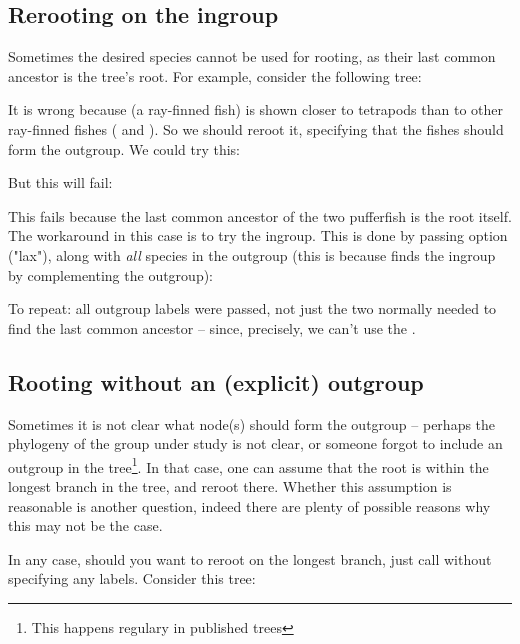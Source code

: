 \subsection{Rerooting on the ingroup}

Sometimes the desired species cannot be used for rooting, as their last common ancestor is the tree's root. For example, consider the following tree:


It is wrong because  (a ray-finned fish) is shown
closer to tetrapods than to other ray-finned fishes ( and
). So we should reroot it, specifying that the fishes should
form the outgroup. We could try this:


But this will fail:


This fails because the last common ancestor of the two pufferfish is
the root itself. The workaround in this case is to try the ingroup. This is
done by passing option  ("lax"), along with {\em all} species in
the outgroup (this is because \reroot{} finds the ingroup by complementing the
outgroup):


To repeat: all outgroup labels were passed, not just the two
normally needed to find the last common ancestor -- since, precisely, we can't
use the \lca.

\subsection[sct:no-outgroup]{Rooting without an (explicit) outgroup}


Sometimes it is not clear what node(s) should form the outgroup --
perhaps the phylogeny of the group under study is not clear, or someone forgot
to include an outgroup in the tree\footnote{This happens regulary in published
trees}. In that case, one can assume that the root is within the longest branch
in the tree, and reroot there. Whether this assumption is reasonable is another
question, indeed there are plenty of possible reasons why this may not be the
case.

In any case, should you want to reroot on the longest branch, just call
\reroot{} without specifying any labels. Consider this tree:


